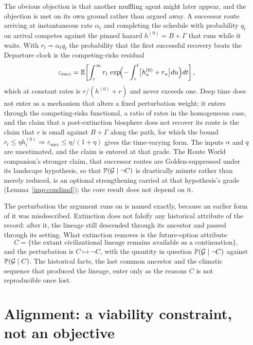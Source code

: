 The obvious objection is that another muffling agent might later
appear, and the objection is met on its own ground rather than argued
away. A successor route arriving at instantaneous rate $\alpha_t$ and
completing the schedule with probability $q_t$ on arrival competes
against the pinned hazard $h^{(0)}=B+\Gamma$ that runs while it waits.
With $r_t=\alpha_tq_t$ the probability that the first successful
recovery beats the Departure clock is the competing-risks residual
\begin{equation}\label{eq:epssucc}
\varepsilon_{\mathrm{succ}}
=\mathbb{E}\!\left[\int_\tau^\infty r_t\,\exp\!\Bigl(-\int_\tau^t\bigl[h^{(0)}_u+r_u\bigr]du\Bigr)dt\right],
\end{equation}
which at constant rates is $r/(h^{(0)}+r)$ and never exceeds one. Deep
time does not enter as a mechanism that alters a fixed perturbation
weight; it enters through the competing-risks functional, a ratio of
rates in the homogeneous case, and the claim that a post-extinction
biosphere does not recover its route is the claim that $r$ is small
against $B+\Gamma$ along the path, for which the bound
$r_t\le\eta h^{(0)}_t\Rightarrow\varepsilon_{\mathrm{succ}}\le\eta/(1+\eta)$
gives the time-varying form. The inputs $\alpha$ and $q$ are
unestimated, and the claim is entered at that grade. The Route World
companion's stronger claim, that successor routes are Golden-suppressed
under its landscape hypothesis, so that $\mathbb{P}(\mathcal G\mid\neg C)$ is
drastically minute rather than merely reduced, is an optional
strengthening carried at that hypothesis's grade
(Lemma~\ref{imp:condimd}); the core result does not depend on it.

The perturbation the argument runs on is named exactly, because an
earlier form of it was misdescribed. Extinction does not falsify any
historical attribute of the record: after it, the lineage still
descended through its ancestor and passed through its setting. What
extinction removes is the future-option attribute
\[
C=\{\text{the extant civilizational lineage remains available as a continuation}\},
\]
and the perturbation is $C\mapsto\neg C$, with the quantity in question
$\mathbb{P}(\mathcal G\mid\neg C)$ against $\mathbb{P}(\mathcal G\mid C)$. The
historical facts, the last common ancestor and the climatic sequence
that produced the lineage, enter only as the reasons $C$ is not
reproducible once lost.

\section{Alignment: a viability constraint, not an objective}\label{sec:alignment}

